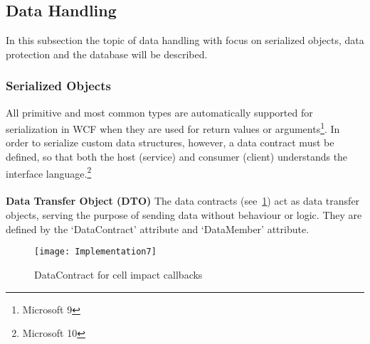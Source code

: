 \subsection {Data Handling}
In this subsection the topic of data handling with focus on serialized
objects, data protection and the database will be described.

\subsubsection {Serialized Objects}
All primitive and most common types are automatically supported for
serialization in WCF when they are used for return values or
arguments\footnote{Microsoft 9}. In order to serialize custom data
structures, however, a data contract must be defined, so that both
the host (service) and consumer (client) understands the interface
language.\footnote{Microsoft 10}
\\
\\
\textbf {Data Transfer Object (DTO)}
The data contracts (see~\ref{fig:implementation7}) act as data
transfer objects, serving the purpose of sending data without behaviour
 or logic. They are defined by the ‘DataContract’ attribute and
  ‘DataMember’ attribute.

\begin{figure}[h]
\centerline{\texttt{[image: Implementation7]}}
\caption {DataContract for cell impact callbacks}
\label {fig:implementation7}
\end{figure}

